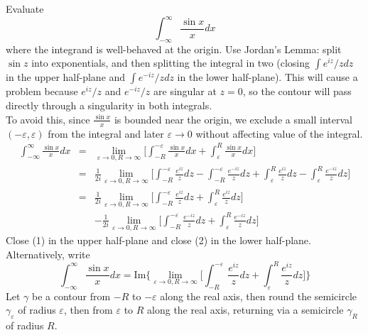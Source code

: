 \documentclass[a4paper]{article}
\begin{document}
\begin{eg}
Evaluate 
$$\int_{-\infty}^\infty\frac{\sin x}{x}dx$$
where the integrand is well-behaved at the origin. Use Jordan's Lemma: split $\sin z$ into exponentials, and then splitting the integral in two (closing $\int e^{iz}/zdz$ in the upper half-plane and $\int e^{-iz}/zdz$ in the lower half-plane). This will cause a problem because $e^{iz}/z$ and $e^{-iz}/z$ are singular at $z=0$, so the contour will pass directly through a singularity in both integrals.\\[5pt]
To avoid this, since $\frac{\sin x}{x}$ is bounded near the origin, we exclude a small interval $(-\varepsilon,\varepsilon)$ from the integral and later $\varepsilon\rightarrow 0$ without affecting value of the integral.
\begin{eqnarray}
\int_{-\infty}^\infty\frac{\sin x}{x}dx&=&\lim_{\varepsilon\rightarrow0,R\rightarrow\infty}\bigg[\int_{-R}^{-\varepsilon}\frac{\sin x}{x}dx+\int_{\varepsilon}^R\frac{\sin x}{x}dx\bigg]\nonumber\\&=&\frac{1}{2i}\lim_{\varepsilon\rightarrow0,R\rightarrow\infty}\bigg[\int_{-R}^{-\varepsilon}\frac{e^{iz}}{z}dz-\int_{-R}^{-\varepsilon}\frac{e^{-iz}}{z}dz+\int_{\varepsilon}^R\frac{e^{iz}}{z}dz-\int_{\varepsilon}^R\frac{e^{-iz}}{z}dz\bigg]\nonumber\\&=&\frac{1}{2i}\lim_{\varepsilon\rightarrow0,R\rightarrow\infty}\bigg[\int_{-R}^{-\varepsilon}\frac{e^{iz}}{z}dz+\int_{\varepsilon}^R\frac{e^{iz}}{z}dz\bigg]\\&&-\frac{1}{2i}\lim_{\varepsilon\rightarrow0,R\rightarrow\infty}\bigg[\int_{-R}^{-\varepsilon}\frac{e^{-iz}}{z}dz+\int_{\varepsilon}^R\frac{e^{-iz}}{z}dz\bigg]
\end{eqnarray}
Close (1) in the upper half-plane and close (2) in the lower half-plane. Alternatively, write
$$\int_{-\infty}^\infty\frac{\sin x}{x}dx=\text{Im}\bigg\{\lim_{\varepsilon\rightarrow0,R\rightarrow\infty}\bigg[\int_{-R}^{-\varepsilon}\frac{e^{iz}}{z}dz+\int_{\varepsilon}^R\frac{e^{iz}}{z}dz\bigg]\bigg\}$$
Let $\gamma$ be a contour from $-R$ to $-\varepsilon$ along the real axis, then round the semicircle $\gamma_\varepsilon$ of radius $\varepsilon$, then from $\varepsilon$ to $R$ along the real axis, returning via a semicircle $\gamma_R$ of radius $R$. 
 \begin{center}
\end{center}
\end{eg}
\end{document}
